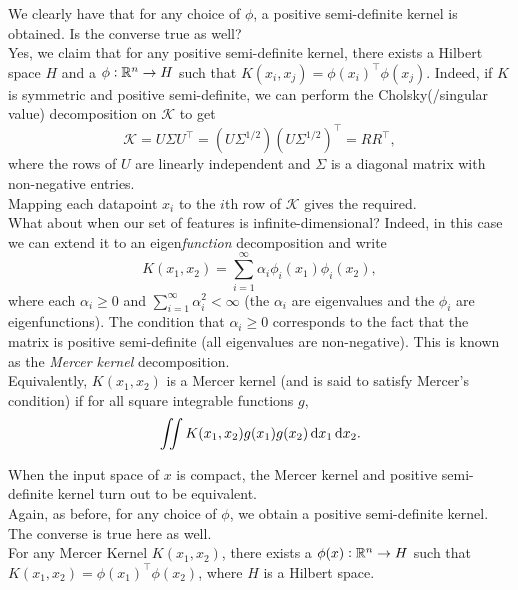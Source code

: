 \documentclass{article}
\begin{document}
		We clearly have that for any choice of $\phi$, a positive semi-definite kernel is obtained. Is the converse true as well?\\
		Yes, we claim that for any positive semi-definite kernel, there exists a Hilbert space $H$ and a $\phi:\mathbb{R}^n \to H$ such that $K(x_i,x_j) = \phi(x_i)^\top \phi(x_j)$. Indeed, if $K$ is symmetric and positive semi-definite, we can perform the Cholsky(/singular value) decomposition on $\mathcal{K}$ to get
		\[ \mathcal{K} = U\Sigma U^\top = (U\Sigma^{1/2})(U\Sigma^{1/2})^\top = RR^\top, \]
		where the rows of $U$ are linearly independent and $\Sigma$ is a diagonal matrix with non-negative entries.\\
		Mapping each datapoint $x_i$ to the $i$th row of $\mathcal{K}$ gives the required.\\

		What about when our set of features is infinite-dimensional? Indeed, in this case we can extend it to an eigen\emph{function} decomposition and write
		\[ K(x_1,x_2) = \sum_{i=1}^\infty \alpha_i \phi_i(x_1) \phi_i(x_2), \]
		where each $\alpha_i \ge 0$ and $\sum_{i=1}^\infty \alpha_i^2 < \infty$ (the $\alpha_i$ are eigenvalues and the $\phi_i$ are eigenfunctions). The condition that $\alpha_i \ge 0$ corresponds to the fact that the matrix is positive semi-definite (all eigenvalues are non-negative). This is known as the \emph{Mercer kernel} decomposition.\\

		Equivalently, $K(x_1,x_2)$ is a Mercer kernel (and is said to satisfy Mercer's condition) if for all square integrable functions $g$,
		\[ \iint K(x_1,x_2) g(x_1) g(x_2) \dif x_1 \dif x_2. \]

		When the input space of $x$ is compact, the Mercer kernel and positive semi-definite kernel turn out to be equivalent.\\
		
		Again, as before, for any choice of $\phi$, we obtain a positive semi-definite kernel. The converse is true here as well.\\
		For any Mercer Kernel $K(x_1,x_2)$, there exists a $\phi(x) : \mathbb{R}^n \to H$ such that $K(x_1,x_2) = \phi(x_1)^\top \phi(x_2)$, where $H$ is a Hilbert space. 



% 
% 
\end{document}
